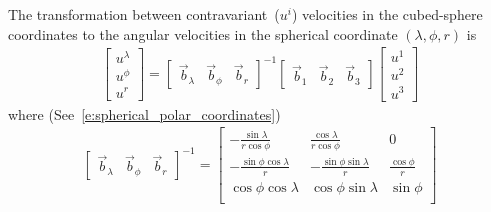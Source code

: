 \documentclass{report}
\begin{document}
The transformation between contravariant~($u^i$) velocities in the cubed-sphere coordinates to the angular velocities in the spherical coordinate $(\lambda, \phi, r)$ is
\begin{align*}
\begin{bmatrix}
             u^{\lambda} \\ u^{\phi} \\ u^{r}
        \end{bmatrix}  
        =
        \begin{bmatrix}
             \vec{b}_{\lambda} & \vec{b}_{\phi} & \vec{b}_{r}
        \end{bmatrix}^{-1}
        \begin{bmatrix}
             \vec{b}_{1}&  \vec{b}_{2}& \vec{b}_{3}
        \end{bmatrix}
        \begin{bmatrix}
             u^{1} \\ u^{2} \\ u^{3}
        \end{bmatrix}
\end{align*}
where (See~\eqref{e:spherical_polar_coordinates})
\begin{align*}
\begin{bmatrix}
\vec{b}_{\lambda} & \vec{b}_{\phi} & \vec{b}_{r}
\end{bmatrix}^{-1} 
= 
\begin{bmatrix}
-\frac{\sin \lambda}{r\cos\phi} & \frac{\cos \lambda}{r\cos\phi} & 0 \\
-\frac{\sin \phi\cos\lambda}{r} & -\frac{\sin\phi\sin  \lambda}{r} & \frac{\cos \phi}{r} \\
\cos\phi\cos\lambda & \cos\phi\sin\lambda  & \sin\phi \\
\end{bmatrix}
\end{align*}
\end{document}
